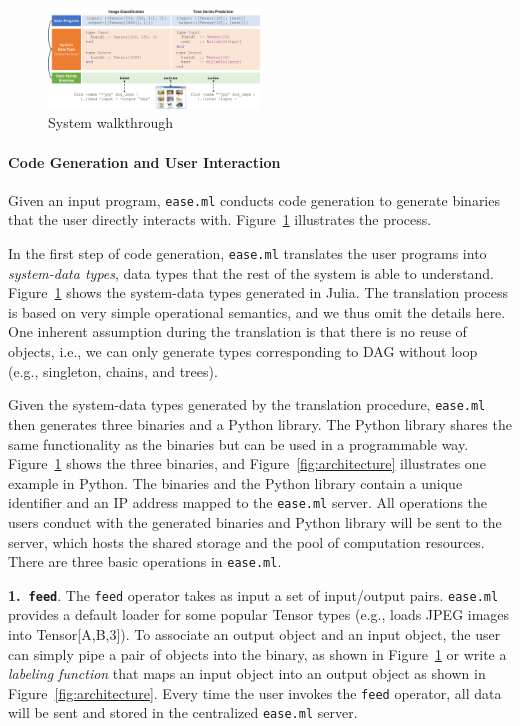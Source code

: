 \documentclass[letterpaper]{vldb}
\newcommand{\eml}{\texttt{ease.ml}\xspace}
\begin{document}
\begin{figure}[t]
\centering
\includegraphics[width=0.5\textwidth]{figures/arch}
\vspace{-2em}
\caption{System walkthrough}
\vspace{-2em}
\label{fig:walkthrough}
\end{figure}


\vspace{-2em}
\paragraph*{Code Generation and User Interaction}

Given an input program, \eml conducts code generation
to generate binaries that the user directly interacts with.
Figure~\ref{fig:walkthrough} illustrates the process.

In the first step of code generation, \eml translates
the user programs into {\em system-data types}, data types
that the rest of the system is able to understand. 
Figure~\ref{fig:walkthrough} shows the system-data types
generated in Julia. The translation process is based
on very simple operational semantics, and we thus omit the details
here. One inherent assumption during the translation
is that there is no reuse of objects, i.e., we can 
only generate types corresponding to DAG without loop
(e.g., singleton, chains, and trees). 

Given the system-data types generated by the translation
procedure, \eml then generates three binaries and
a Python library.
The Python library shares the same functionality as
the binaries but can be used in a programmable way.
Figure~\ref{fig:walkthrough} shows the three binaries,
and Figure~\ref{fig:architecture} illustrates one
example in Python. The binaries and the Python library
contain a unique identifier and an IP address mapped to the
\eml server. All operations the users conduct with
the generated binaries and Python library will be 
sent to the server, which hosts the shared
storage and the pool of computation resources.
There are three basic operations in \eml.

\noindent
{\textbf{1.~\texttt{feed}}.} The \texttt{feed} operator takes
as input a set of input/output pairs. \eml provides
a default loader for some popular Tensor types (e.g., loads
JPEG images into Tensor[A,B,3]). To associate an output
object and an input object, the user can simply pipe a pair of
objects into the binary, as shown in Figure~\ref{fig:walkthrough} or
write a {\em labeling function} that maps an input
object into an output object as shown in Figure~\ref{fig:architecture}.
Every time the user invokes the \texttt{feed} operator,
all data will be sent and stored in the centralized
\eml server.
\end{document}

